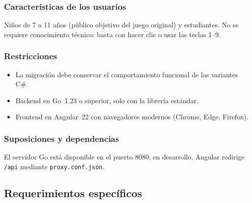 \documentclass[12pt,a4paper]{article}
\begin{document}
\subsubsection{Características de los usuarios}
Niños de 7 a 11 años (público objetivo del juego original) y estudiantes.
No se requiere conocimiento técnico: basta con hacer clic o usar las teclas
1--9.

\subsubsection{Restricciones}
\begin{itemize}
  \item La migración debe conservar el comportamiento funcional de las variantes C\#.
  \item Backend en Go~1.23 o superior, solo con la librería estándar.
  \item Frontend en Angular~22 con navegadores modernos (Chrome, Edge, Firefox).
\end{itemize}

\subsubsection{Suposiciones y dependencias}
El servidor Go está disponible en el puerto 8080; en desarrollo, Angular
redirige \texttt{/api} mediante \texttt{proxy.conf.json}.

\subsection{Requerimientos específicos}
\end{document}
